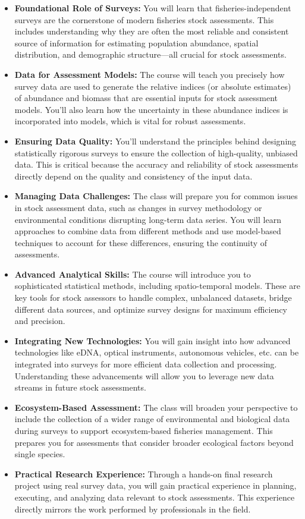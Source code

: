 \documentclass[
  letterpaper,
  oneside,
  open=any]{scrbook}
\providecommand{\tightlist}{%
  \setlength{\itemsep}{0pt}\setlength{\parskip}{0pt}}\usepackage{longtable,booktabs,array}
\begin{document}
\begin{itemize}
\tightlist
\item
  \textbf{Foundational Role of Surveys:} You will learn that
  fisheries-independent surveys are the cornerstone of modern fisheries
  stock assessments. This includes understanding why they are often the
  most reliable and consistent source of information for estimating
  population abundance, spatial distribution, and demographic
  structure---all crucial for stock assessments.
\item
  \textbf{Data for Assessment Models:} The course will teach you
  precisely how survey data are used to generate the relative indices
  (or absolute estimates) of abundance and biomass that are essential
  inputs for stock assessment models. You'll also learn how the
  uncertainty in these abundance indices is incorporated into models,
  which is vital for robust assessments.
\item
  \textbf{Ensuring Data Quality:} You'll understand the principles
  behind designing statistically rigorous surveys to ensure the
  collection of high-quality, unbiased data. This is critical because
  the accuracy and reliability of stock assessments directly depend on
  the quality and consistency of the input data.
\item
  \textbf{Managing Data Challenges:} The class will prepare you for
  common issues in stock assessment data, such as changes in survey
  methodology or environmental conditions disrupting long-term data
  series. You will learn approaches to combine data from different
  methods and use model-based techniques to account for these
  differences, ensuring the continuity of assessments.
\item
  \textbf{Advanced Analytical Skills:} The course will introduce you to
  sophisticated statistical methods, including spatio-temporal models.
  These are key tools for stock assessors to handle complex, unbalanced
  datasets, bridge different data sources, and optimize survey designs
  for maximum efficiency and precision.
\item
  \textbf{Integrating New Technologies:} You will gain insight into how
  advanced technologies like eDNA, optical instruments, autonomous
  vehicles, etc. can be integrated into surveys for more efficient data
  collection and processing. Understanding these advancements will allow
  you to leverage new data streams in future stock assessments.
\item
  \textbf{Ecosystem-Based Assessment:} The class will broaden your
  perspective to include the collection of a wider range of
  environmental and biological data during surveys to support
  ecosystem-based fisheries management. This prepares you for
  assessments that consider broader ecological factors beyond single
  species.
\item
  \textbf{Practical Research Experience:} Through a hands-on final
  research project using real survey data, you will gain practical
  experience in planning, executing, and analyzing data relevant to
  stock assessments. This experience directly mirrors the work performed
  by professionals in the field.
\end{itemize}
\end{document}
